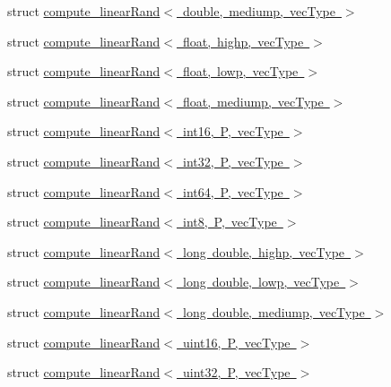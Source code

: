 \begin{DoxyCompactItemize}
struct \mbox{\hyperlink{structglm_1_1detail_1_1compute__linear_rand_3_01double_00_01mediump_00_01vec_type_01_4}{compute\+\_\+linear\+Rand$<$ double, mediump, vec\+Type $>$}}
\item 
struct \mbox{\hyperlink{structglm_1_1detail_1_1compute__linear_rand_3_01float_00_01highp_00_01vec_type_01_4}{compute\+\_\+linear\+Rand$<$ float, highp, vec\+Type $>$}}
\item 
struct \mbox{\hyperlink{structglm_1_1detail_1_1compute__linear_rand_3_01float_00_01lowp_00_01vec_type_01_4}{compute\+\_\+linear\+Rand$<$ float, lowp, vec\+Type $>$}}
\item 
struct \mbox{\hyperlink{structglm_1_1detail_1_1compute__linear_rand_3_01float_00_01mediump_00_01vec_type_01_4}{compute\+\_\+linear\+Rand$<$ float, mediump, vec\+Type $>$}}
\item 
struct \mbox{\hyperlink{structglm_1_1detail_1_1compute__linear_rand_3_01int16_00_01_p_00_01vec_type_01_4}{compute\+\_\+linear\+Rand$<$ int16, P, vec\+Type $>$}}
\item 
struct \mbox{\hyperlink{structglm_1_1detail_1_1compute__linear_rand_3_01int32_00_01_p_00_01vec_type_01_4}{compute\+\_\+linear\+Rand$<$ int32, P, vec\+Type $>$}}
\item 
struct \mbox{\hyperlink{structglm_1_1detail_1_1compute__linear_rand_3_01int64_00_01_p_00_01vec_type_01_4}{compute\+\_\+linear\+Rand$<$ int64, P, vec\+Type $>$}}
\item 
struct \mbox{\hyperlink{structglm_1_1detail_1_1compute__linear_rand_3_01int8_00_01_p_00_01vec_type_01_4}{compute\+\_\+linear\+Rand$<$ int8, P, vec\+Type $>$}}
\item 
struct \mbox{\hyperlink{structglm_1_1detail_1_1compute__linear_rand_3_01long_01double_00_01highp_00_01vec_type_01_4}{compute\+\_\+linear\+Rand$<$ long double, highp, vec\+Type $>$}}
\item 
struct \mbox{\hyperlink{structglm_1_1detail_1_1compute__linear_rand_3_01long_01double_00_01lowp_00_01vec_type_01_4}{compute\+\_\+linear\+Rand$<$ long double, lowp, vec\+Type $>$}}
\item 
struct \mbox{\hyperlink{structglm_1_1detail_1_1compute__linear_rand_3_01long_01double_00_01mediump_00_01vec_type_01_4}{compute\+\_\+linear\+Rand$<$ long double, mediump, vec\+Type $>$}}
\item 
struct \mbox{\hyperlink{structglm_1_1detail_1_1compute__linear_rand_3_01uint16_00_01_p_00_01vec_type_01_4}{compute\+\_\+linear\+Rand$<$ uint16, P, vec\+Type $>$}}
\item 
struct \mbox{\hyperlink{structglm_1_1detail_1_1compute__linear_rand_3_01uint32_00_01_p_00_01vec_type_01_4}{compute\+\_\+linear\+Rand$<$ uint32, P, vec\+Type $>$}}

\end{DoxyCompactItemize}
